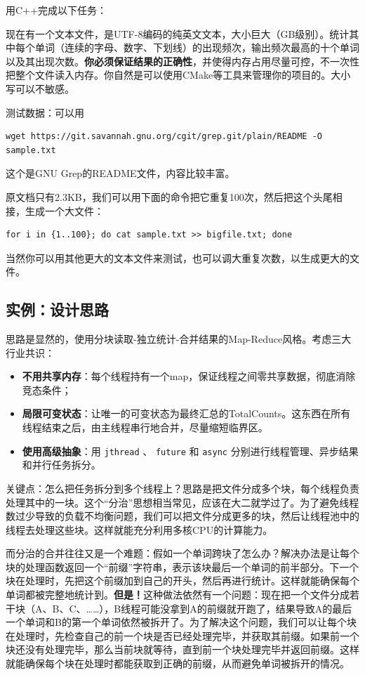 用C++完成以下任务：

现在有一个文本文件，是UTF-8编码的纯英文文本，大小巨大（GB级别）。统计其中每个单词（连续的字母、数字、下划线）的出现频次，输出频次最高的十个单词以及其出现次数。\textbf{你必须保证结果的正确性}，并使得内存占用尽量可控，不一次性把整个文件读入内存。你自然是可以使用CMake等工具来管理你的项目的。大小写可以不敏感。

测试数据：可以用
\begin{verbatim}
wget https://git.savannah.gnu.org/cgit/grep.git/plain/README -O sample.txt
\end{verbatim}
这个是GNU Grep的README文件，内容比较丰富。

原文档只有2.3KB，我们可以用下面的命令把它重复100次，然后把这个头尾相接，生成一个大文件：
\begin{verbatim}
for i in {1..100}; do cat sample.txt >> bigfile.txt; done
\end{verbatim}
当然你可以用其他更大的文本文件来测试，也可以调大重复次数，以生成更大的文件。

\subsection{实例：设计思路}

思路是显然的，使用分块读取-独立统计-合并结果的Map-Reduce风格。考虑三大行业共识：
\begin{itemize}
    \item \textbf{不用共享内存}：每个线程持有一个map，保证线程之间零共享数据，彻底消除竞态条件；
    \item \textbf{局限可变状态}：让唯一的可变状态为最终汇总的TotalCounts。这东西在所有线程结束之后，由主线程串行地合并，尽量缩短临界区。
    \item \textbf{使用高级抽象}：用 \texttt{jthread} 、 \texttt{future} 和 \texttt{async} 分别进行线程管理、异步结果和并行任务拆分。
\end{itemize}

关键点：怎么把任务拆分到多个线程上？思路是把文件分成多个块，每个线程负责处理其中的一块。这个“分治”思想相当常见，应该在大二就学过了。为了避免线程数过少导致的负载不均衡问题，我们可以把文件分成更多的块，然后让线程池中的线程去处理这些块。这样就能充分利用多核CPU的计算能力。

而分治的合并往往又是一个难题：假如一个单词跨块了怎么办？解决办法是让每个块的处理函数返回一个“前缀”字符串，表示该块最后一个单词的前半部分。下一个块在处理时，先把这个前缀加到自己的开头，然后再进行统计。这样就能确保每个单词都被完整地统计到。\textbf{但是！}这种做法依然有一个问题：现在把一个文件分成若干块（A、B、C、……），B线程可能没拿到A的前缀就开跑了，结果导致A的最后一个单词和B的第一个单词依然被拆开了。为了解决这个问题，我们可以让每个块在处理时，先检查自己的前一个块是否已经处理完毕，并获取其前缀。如果前一个块还没有处理完毕，那么当前块就等待，直到前一个块处理完毕并返回前缀。这样就能确保每个块在处理时都能获取到正确的前缀，从而避免单词被拆开的情况。

